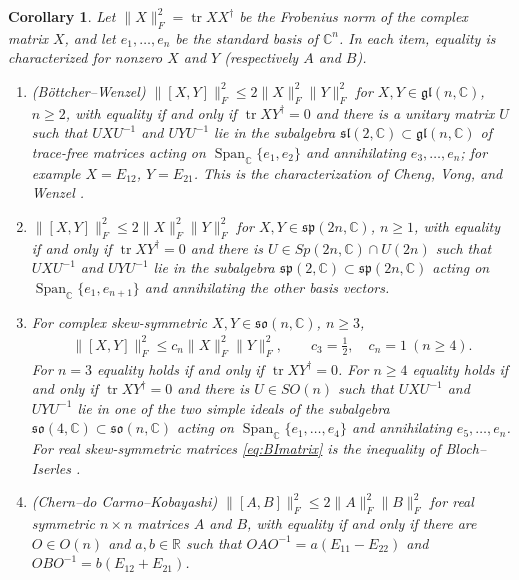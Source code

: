 \documentclass[leqno,10pt]{amsart}
\newtheorem{corollary}[theorem]{Corollary}%
\theoremstyle{definition}
\numberwithin{equation}{section}
\newcommand{\so}{\mathfrak{so}}
\renewcommand{\sp}{\mathfrak{sp}}
\newcommand{\spn}{\operatorname{Span}}
\newcommand{\gl}{\mathfrak{gl}}
\newcommand{\sll}{\mathfrak{sl}}
\newcommand{\rea}{\mathbb R}
\newcommand{\com}{\mathbb C}
\newcommand{\tr}{\operatorname{tr}}
\newcommand{\fnorm}[1]{\lVert #1\rVert_{F}}
\begin{document}
\begin{corollary}\label{cor:matrix}
Let $\fnorm{X}^{2} = \tr XX^{\dagger}$ be the Frobenius norm of the complex matrix $X$, and let $e_{1}, \dots, e_{n}$ be the standard basis of $\com^{n}$. In each item, equality is characterized for nonzero $X$ and $Y$ (respectively $A$ and $B$).
\begin{enumerate}[label=(\arabic*), ref=(\arabic*)]
\item\label{mat1} (Böttcher--Wenzel) $\fnorm{[X, Y]}^{2} \leq 2\fnorm{X}^{2}\fnorm{Y}^{2}$ for $X, Y \in \gl(n, \com)$, $n \geq 2$, with equality if and only if $\tr XY^{\dagger} = 0$ and there is a unitary matrix $U$ such that $UXU^{-1}$ and $UYU^{-1}$ lie in the subalgebra $\sll(2, \com) \subset \gl(n, \com)$ of trace-free matrices acting on $\spn_{\com}\{e_{1}, e_{2}\}$ and annihilating $e_{3}, \dots, e_{n}$; for example $X = E_{12}$, $Y = E_{21}$. This is the characterization of Cheng, Vong, and Wenzel \cite[Theorems~3.1 and 3.2]{Cheng-Vong-Wenzel}.
\item\label{mat2} $\fnorm{[X, Y]}^{2} \leq 2\fnorm{X}^{2}\fnorm{Y}^{2}$ for $X, Y \in \sp(2n, \com)$, $n \geq 1$, with equality if and only if $\tr XY^{\dagger} = 0$ and there is $U \in Sp(2n, \com) \cap U(2n)$ such that $UXU^{-1}$ and $UYU^{-1}$ lie in the subalgebra $\sp(2, \com) \subset \sp(2n, \com)$ acting on $\spn_{\com}\{e_{1}, e_{n+1}\}$ and annihilating the other basis vectors.
\item\label{mat3} For complex skew-symmetric $X, Y \in \so(n, \com)$, $n \geq 3$,
\begin{align}\label{eq:BImatrix}
\fnorm{[X, Y]}^{2} \leq c_{n}\fnorm{X}^{2}\fnorm{Y}^{2}, \qquad c_{3} = \tfrac{1}{2}, \quad c_{n} = 1 \ (n \geq 4).
\end{align}
For $n = 3$ equality holds if and only if $\tr XY^{\dagger} = 0$. For $n \geq 4$ equality holds if and only if $\tr XY^{\dagger} = 0$ and there is $U \in SO(n)$ such that $UXU^{-1}$ and $UYU^{-1}$ lie in one of the two simple ideals of the subalgebra $\so(4, \com) \subset \so(n, \com)$ acting on $\spn_{\com}\{e_{1}, \dots, e_{4}\}$ and annihilating $e_{5}, \dots, e_{n}$. For real skew-symmetric matrices \eqref{eq:BImatrix} is the inequality of Bloch--Iserles \cite{Bloch-Iserles}.
\item\label{mat4} (Chern--do Carmo--Kobayashi) $\fnorm{[A, B]}^{2} \leq 2\fnorm{A}^{2}\fnorm{B}^{2}$ for real symmetric $n \times n$ matrices $A$ and $B$, with equality if and only if there are $O \in O(n)$ and $a, b \in \rea$ such that $OAO^{-1} = a(E_{11} - E_{22})$ and $OBO^{-1} = b(E_{12} + E_{21})$.
\end{enumerate}
\end{corollary}
\end{document}
